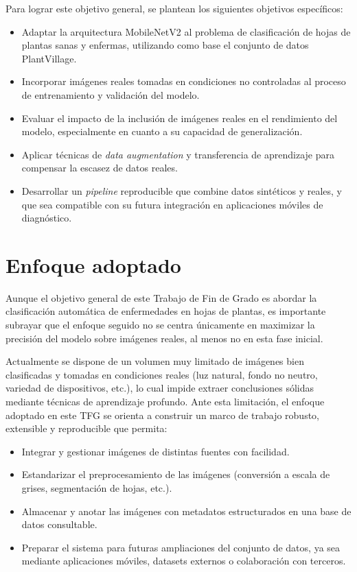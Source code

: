 \documentclass[11pt,spanish,listoffigures,listoftables]{tfgetsinf}
\begin{document}
Para lograr este objetivo general, se plantean los siguientes objetivos específicos:

\begin{itemize}
    \item Adaptar la arquitectura MobileNetV2 al problema de clasificación de hojas de plantas sanas y enfermas, utilizando como base el conjunto de datos PlantVillage.
    \item Incorporar imágenes reales tomadas en condiciones no controladas al proceso de entrenamiento y validación del modelo.
    \item Evaluar el impacto de la inclusión de imágenes reales en el rendimiento del modelo, especialmente en cuanto a su capacidad de generalización.
    \item Aplicar técnicas de \textit{data augmentation} y transferencia de aprendizaje para compensar la escasez de datos reales.
    \item Desarrollar un \textit{pipeline} reproducible que combine datos sintéticos y reales, y que sea compatible con su futura integración en aplicaciones móviles de diagnóstico.
\end{itemize}

\section*{Enfoque adoptado}

Aunque el objetivo general de este Trabajo de Fin de Grado es abordar la clasificación automática de enfermedades en hojas de plantas, es importante subrayar que el enfoque seguido no se centra únicamente en maximizar la precisión del modelo sobre imágenes reales, al menos no en esta fase inicial.

Actualmente se dispone de un volumen muy limitado de imágenes bien clasificadas y tomadas en condiciones reales (luz natural, fondo no neutro, variedad de dispositivos, etc.), lo cual impide extraer conclusiones sólidas mediante técnicas de aprendizaje profundo. Ante esta limitación, el enfoque adoptado en este TFG se orienta a construir un marco de trabajo robusto, extensible y reproducible que permita:

\begin{itemize}
  \item Integrar y gestionar imágenes de distintas fuentes con facilidad.
  \item Estandarizar el preprocesamiento de las imágenes (conversión a escala de grises, segmentación de hojas, etc.).
  \item Almacenar y anotar las imágenes con metadatos estructurados en una base de datos consultable.
  \item Preparar el sistema para futuras ampliaciones del conjunto de datos, ya sea mediante aplicaciones móviles, datasets externos o colaboración con terceros.
\end{itemize}
\end{document}
